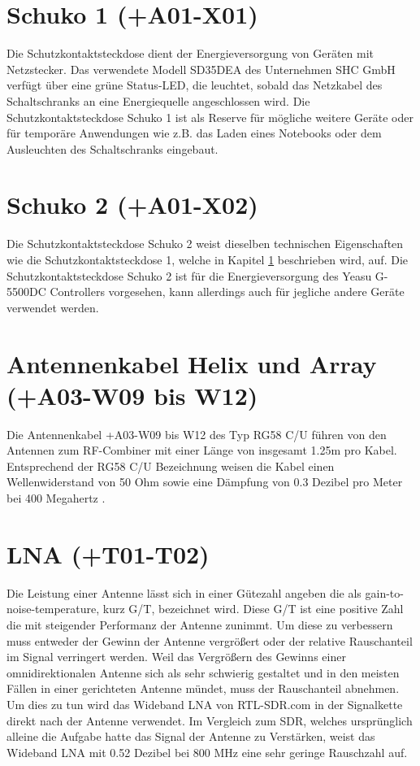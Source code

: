 \section{Schuko 1 (+A01-X01)}
\label{sec:schuko1}
Die Schutzkontaktsteckdose dient der Energieversorgung von Geräten mit Netzstecker. Das verwendete Modell SD35DEA des Unternehmen SHC GmbH verfügt über eine grüne Status-LED, die leuchtet, sobald das Netzkabel des Schaltschranks an eine Energiequelle angeschlossen wird. Die Schutzkontaktsteckdose Schuko 1 ist als Reserve für mögliche weitere Geräte oder für temporäre Anwendungen wie z.B. das Laden eines Notebooks oder dem Ausleuchten des Schaltschranks eingebaut.

\section{Schuko 2 (+A01-X02)}
Die Schutzkontaktsteckdose Schuko 2 weist dieselben technischen Eigenschaften wie die Schutzkontaktsteckdose 1, welche in Kapitel \ref{sec:schuko1} beschrieben wird, auf. Die Schutzkontaktsteckdose Schuko 2 ist für die Energieversorgung des Yeasu G-5500DC Controllers vorgesehen, kann allerdings auch für jegliche andere Geräte verwendet werden.

\section{Antennenkabel Helix und Array (+A03-W09 bis W12)}
Die Antennenkabel +A03-W09 bis W12 des Typ RG58 C/U führen von den Antennen zum RF-Combiner mit einer Länge von insgesamt 1.25m pro Kabel. Entsprechend der RG58 C/U Bezeichnung weisen die Kabel einen Wellenwiderstand von 50 Ohm sowie \cite{noauthor_rg_nodate} eine Dämpfung von 0.3 Dezibel pro Meter bei 400 Megahertz \cite{noauthor_vergleich_nodate}. 

\section{LNA (+T01-T02)}
Die Leistung einer Antenne lässt sich in einer Gütezahl angeben die als gain-to-noise-temperature, kurz G/T, bezeichnet wird. Diese G/T ist eine positive Zahl die mit steigender Performanz der Antenne zunimmt. Um diese zu verbessern muss entweder der Gewinn der Antenne vergrößert oder der relative Rauschanteil im Signal verringert werden. Weil das Vergrößern des Gewinns einer omnidirektionalen Antenne sich als sehr schwierig gestaltet und in den meisten Fällen in einer gerichteten Antenne mündet, muss der Rauschanteil abnehmen. Um dies zu tun wird das Wideband LNA von RTL-SDR.com in der Signalkette direkt nach der Antenne verwendet. Im Vergleich zum SDR, welches ursprünglich alleine die Aufgabe hatte das Signal der Antenne zu Verstärken, weist das Wideband LNA mit 0.52 Dezibel bei 800 MHz eine sehr geringe Rauschzahl auf. \cite{noauthor_new_nodate} \cite{noauthor_omnidirectional_nodate}

